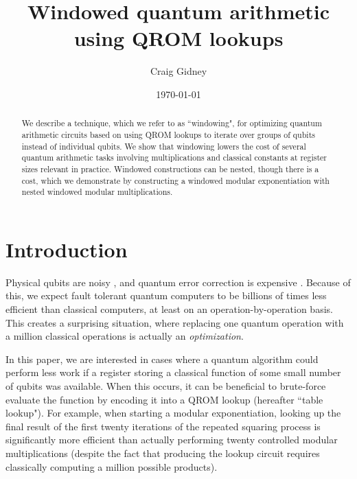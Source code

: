 \documentclass[onecolumn,unpublished]{quantumarticle}
\theoremstyle{definition}
\theoremstyle{definition}
\theoremstyle{definition}
\begin{document}
\title{Windowed quantum arithmetic using QROM lookups}

\date{\today}
\author{Craig Gidney}

\begin{abstract}
We describe a technique, which we refer to as ``windowing", for optimizing quantum arithmetic circuits based on using QROM lookups to iterate over groups of qubits instead of individual qubits.
We show that windowing lowers the cost of several quantum arithmetic tasks involving multiplications and classical constants at register sizes relevant in practice.
Windowed constructions can be nested, though there is a cost, which we demonstrate by constructing a windowed modular exponentiation with nested windowed modular multiplications.
\end{abstract}

\maketitle




\section{Introduction}
\label{sec:introduction}

Physical qubits are noisy \cite{schroeder2009dram,Bare13,Kim2014}, and quantum error correction is expensive \cite{fowler2012surfacecodereview, campbell2018constraintsatisfaction}.
Because of this, we expect fault tolerant quantum computers to be billions of times less efficient than classical computers, at least on an operation-by-operation basis.
This creates a surprising situation, where replacing one quantum operation with a million classical operations is actually an {\em optimization}.

In this paper, we are interested in cases where a quantum algorithm could perform less work if a register storing a classical function of some small number of qubits was available.
When this occurs, it can be beneficial to brute-force evaluate the function by encoding it into a QROM lookup \cite{babbush2018} (hereafter ``table lookup").
For example, when starting a modular exponentiation, looking up the final result of the first twenty iterations of the repeated squaring process is significantly more efficient than actually performing twenty controlled modular multiplications (despite the fact that producing the lookup circuit requires classically computing a million possible products).
\end{document}
